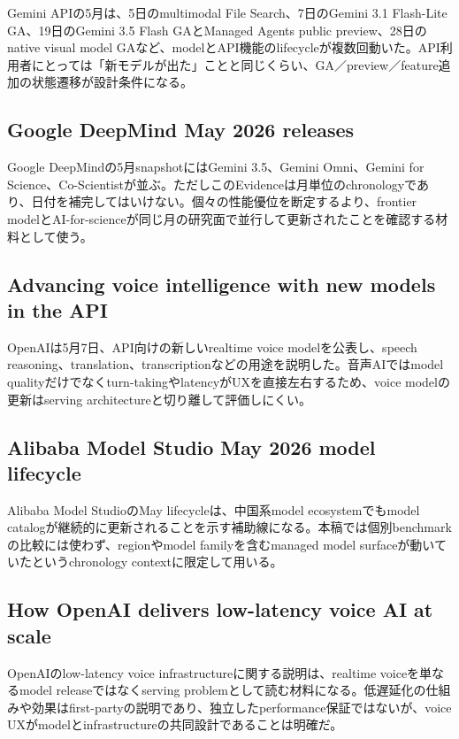 Gemini APIの5月は、5日のmultimodal File Search、7日のGemini 3.1 Flash-Lite GA、19日のGemini 3.5 Flash GAとManaged Agents public preview、28日のnative visual model GAなど、modelとAPI機能のlifecycleが複数回動いた。API利用者にとっては「新モデルが出た」ことと同じくらい、GA／preview／feature追加の状態遷移が設計条件になる。\autocite{src-a24fd97eb3d0}


\subsection{Google DeepMind May 2026 releases}

Google DeepMindの5月snapshotにはGemini 3.5、Gemini Omni、Gemini for Science、Co-Scientistが並ぶ。ただしこのEvidenceは月単位のchronologyであり、日付を補完してはいけない。個々の性能優位を断定するより、frontier modelとAI-for-scienceが同じ月の研究面で並行して更新されたことを確認する材料として使う。\autocite{src-dd5d9b8662f3}


\subsection{Advancing voice intelligence with new models in the API}

OpenAIは5月7日、API向けの新しいrealtime voice modelを公表し、speech reasoning、translation、transcriptionなどの用途を説明した。音声AIではmodel qualityだけでなくturn-takingやlatencyがUXを直接左右するため、voice modelの更新はserving architectureと切り離して評価しにくい。\autocite{src-24a3c172de48}


\subsection{Alibaba Model Studio May 2026 model lifecycle}

Alibaba Model StudioのMay lifecycleは、中国系model ecosystemでもmodel catalogが継続的に更新されることを示す補助線になる。本稿では個別benchmarkの比較には使わず、regionやmodel familyを含むmanaged model surfaceが動いていたというchronology contextに限定して用いる。\autocite{src-eac8dfbeb78c}


\subsection{How OpenAI delivers low-latency voice AI at scale}

OpenAIのlow-latency voice infrastructureに関する説明は、realtime voiceを単なるmodel releaseではなくserving problemとして読む材料になる。低遅延化の仕組みや効果はfirst-partyの説明であり、独立したperformance保証ではないが、voice UXがmodelとinfrastructureの共同設計であることは明確だ。\autocite{src-5c3d93bd7160}


